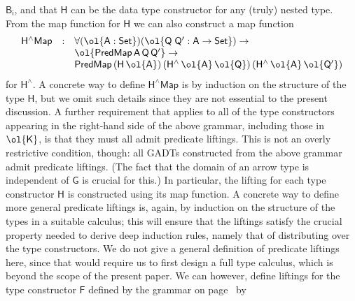 \documentclass[sigplan,10pt]{acmart}
\begin{document}
$\mathsf{B_i}$, and that $\mathsf{H}$ can be the data type constructor
for any (truly) nested type. From the map function for $\mathsf{H}$ we
can also construct a map function
\begin{equation}\label{eq:hliftmap}
\begin{array}{lll}
\mathsf{H^\wedge Map} & : & \mathsf{\forall (\ol{A : Set}) (\ol{Q\;Q'
    : A \to Set}) \to}\\
& & \mathsf{\ol{PredMap\,A\,Q\,Q'} \to}\\
& & \mathsf{PredMap\,(H\,\ol{A})\,(H^{\wedge}\,\ol{A}\,\ol{Q})\, 
(H^{\wedge}\,\ol{A}\,\ol{Q'})}
\end{array}
\end{equation}
for $\mathsf{H^{\wedge}}$. A concrete way to define $\mathsf{H^\wedge
  Map}$ is by induction on the structure of the type $\mathsf{H}$, but
we omit such details since they are not essential to the present
discussion. A further requirement that applies to all of the type
constructors appearing in the right-hand side of the above grammar,
including those in $\ol{\mathsf{K}}$, is that they must all admit
predicate liftings. This is not an overly restrictive condition,
though: all
GADTs constructed from the above grammar admit predicate liftings.
(The fact that the domain of an arrow type is independent of
$\mathsf{G}$ is crucial for this.) In particular, the lifting for each
type constructor $\mathsf{H}$ is constructed using its map function.
A concrete way to define more general predicate liftings is, again, by
induction on the structure of the types in a suitable calculus; this
will ensure that the liftings satisfy the crucial property needed to
derive deep induction rules, namely that of distributing over the type
constructors. We do not give a general definition of predicate
liftings here, since that would require us to first design a full type
calculus, which is beyond the scope of the present paper. We can
however, define liftings for the type constructor $\mathsf{F}$ defined
by the grammar on page~\pageref{grammar} by
\end{document}

